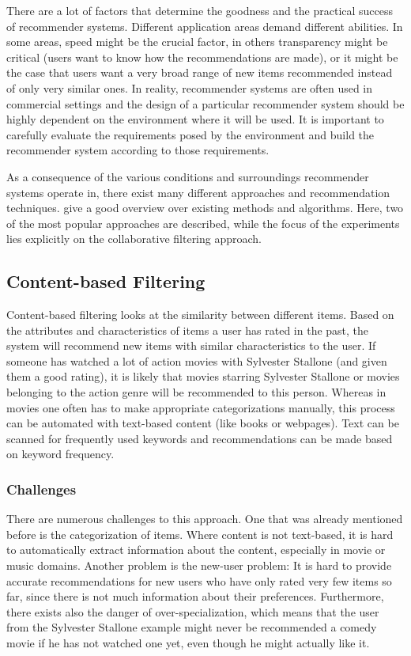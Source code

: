 There are a lot of factors that determine the goodness and the practical success of recommender systems. Different application areas demand different abilities. In some areas, speed might be the crucial factor, in others transparency might be critical (users want to know how the recommendations are made), or it might be the case that users want a very broad range of new items recommended instead of only very similar ones. In reality, recommender systems are often used in commercial settings and the design of a particular recommender system should be highly dependent on the environment where it will be used. It is important to carefully evaluate the requirements posed by the environment and build the recommender system according to those requirements.
\newline

As a consequence of the various conditions and surroundings recommender systems operate in, there exist many different approaches and recommendation techniques. \cite{Ricci_2011} give a good overview over existing methods and algorithms. Here, two of the most popular approaches are described, while the focus of the experiments lies explicitly on the collaborative filtering approach.

\subsection{Content-based Filtering}
\label{sst:contentbasedfiltering} Content-based filtering looks at the similarity between different items. Based on the attributes and characteristics of items a user has rated in the past, the system will recommend new items with similar characteristics to the user. If someone has watched a lot of action movies with Sylvester Stallone (and given them a good rating), it is likely that movies starring Sylvester Stallone or movies belonging to the action genre will be recommended to this person. Whereas in movies one often has to make appropriate categorizations manually, this process can be automated with text-based content (like books or webpages). Text can be scanned for frequently used keywords and recommendations can be made based on keyword frequency.

\subsubsection{Challenges}
\label{ssst:challenges} There are numerous challenges to this approach. One that was already mentioned before is the categorization of items. Where content is not text-based, it is hard to automatically extract information about the content, especially in movie or music domains. Another problem is the new-user problem: It is hard to provide accurate recommendations for new users who have only rated very few items so far, since there is not much information about their preferences. Furthermore, there exists also the danger of over-specialization, which means that the user from the Sylvester Stallone example might never be recommended a comedy movie if he has not watched one yet, even though he might actually like it.


